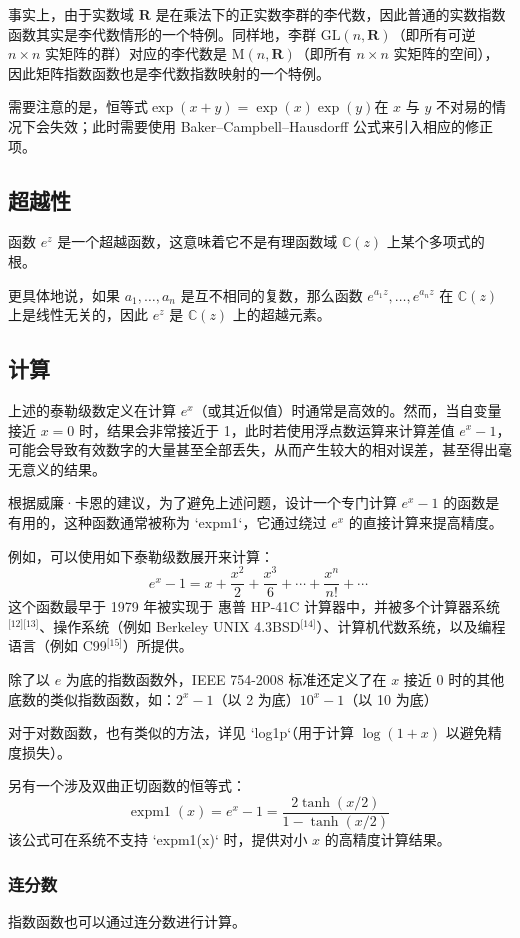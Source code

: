 事实上，由于实数域 $\mathbf{R}$ 是在乘法下的正实数李群的李代数，因此普通的实数指数函数其实是李代数情形的一个特例。同样地，李群 $\mathrm{GL}(n, \mathbf{R})$（即所有可逆 $n \times n$ 实矩阵的群）对应的李代数是 $\mathrm{M}(n, \mathbf{R})$（即所有 $n \times n$ 实矩阵的空间），因此矩阵指数函数也是李代数指数映射的一个特例。

需要注意的是，恒等式$\exp(x + y) = \exp(x)\exp(y)$在 $x$ 与 $y$ 不对易的情况下会失效；此时需要使用 Baker–Campbell–Hausdorff 公式来引入相应的修正项。
\subsection{超越性}
函数 $e^z$ 是一个超越函数，这意味着它不是有理函数域 $\mathbb{C}(z)$ 上某个多项式的根。

更具体地说，如果 $a_1, \ldots, a_n$ 是互不相同的复数，那么函数 $e^{a_1 z}, \ldots, e^{a_n z}$ 在 $\mathbb{C}(z)$ 上是线性无关的，因此 $e^z$ 是 $\mathbb{C}(z)$ 上的超越元素。
\subsection{计算}
上述的泰勒级数定义在计算 $e^x$（或其近似值）时通常是高效的。然而，当自变量接近 $x = 0$ 时，结果会非常接近于 1，此时若使用浮点数运算来计算差值 $e^x - 1$，可能会导致有效数字的大量甚至全部丢失，从而产生较大的相对误差，甚至得出毫无意义的结果。

根据威廉·卡恩的建议，为了避免上述问题，设计一个专门计算 $e^x - 1$ 的函数是有用的，这种函数通常被称为 `expm1`，它通过绕过 $e^x$ 的直接计算来提高精度。

例如，可以使用如下泰勒级数展开来计算：
$$
e^x - 1 = x + \frac{x^2}{2} + \frac{x^3}{6} + \cdots + \frac{x^n}{n!} + \cdots~
$$
这个函数最早于 1979 年被实现于 惠普 HP-41C 计算器中，并被多个计算器系统\(^\text{[12][13]}\)、操作系统（例如 Berkeley UNIX 4.3BSD\(^\text{[14]}\)）、计算机代数系统，以及编程语言（例如 C99\(^\text{[15]}\)）所提供。

除了以 $e$ 为底的指数函数外，IEEE 754-2008 标准还定义了在 $x$ 接近 0 时的其他底数的类似指数函数，如：$2^x - 1$（以 2 为底）$10^x - 1$（以 10 为底）

对于对数函数，也有类似的方法，详见 `log1p`（用于计算 $\log(1 + x)$ 以避免精度损失）。

另有一个涉及双曲正切函数的恒等式：
$$
\operatorname{expm1}(x) = e^x - 1 = \frac{2 \tanh(x/2)}{1 - \tanh(x/2)}~
$$
该公式可在系统不支持 `expm1(x)` 时，提供对小 $x$ 的高精度计算结果。
\subsubsection{连分数}
指数函数也可以通过连分数进行计算。

